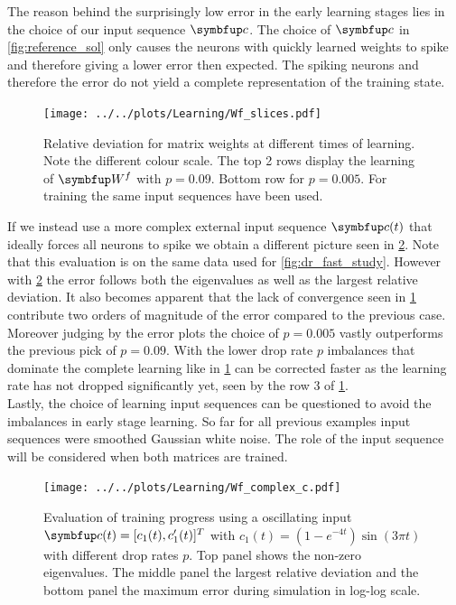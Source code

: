 The reason behind the surprisingly low error in the early learning stages lies in the choice of our input sequence $\bmu{c}$. The choice of $\bmu{c}$ in \cref{fig:reference_sol} only causes the neurons with quickly learned weights to spike and therefore giving a lower error then expected. The spiking neurons and therefore the error do not yield a complete representation of the training state.\\
\begin{figure}
	\centering
	\texttt{[image: ../../plots/Learning/Wf\_slices.pdf]}
	\caption{Relative deviation for matrix weights at different times of learning. Note the different colour scale. The top 2 rows display the learning of $\bmu{W}^f$ with $p = 0.09$. Bottom row for $p=0.005$. For training the same input sequences have been used.}
	\label{fig:Wf_slices}
\end{figure}
If we instead use a more complex external input sequence $\bmu{c}(t)$ that ideally forces all neurons to spike we obtain a different picture seen in \cref{fig:complex_seq}. Note that this evaluation is on the same data used for \cref{fig:dr_fast_study}. However with \cref{fig:complex_seq} the error follows both the eigenvalues as well as the largest relative deviation. It also becomes apparent that the lack of convergence seen in \cref{fig:Wf_slices} contribute two orders of magnitude of the error compared to the previous case. Moreover judging by the error plots the choice of $p = 0.005$ vastly outperforms the previous pick of $p= 0.09$. With the lower drop rate $p$ imbalances that dominate the complete learning like in \cref{fig:Wf_slices} can be corrected faster as the learning rate has not dropped significantly yet, seen by the row 3 of \cref{fig:Wf_slices}.\\
Lastly, the choice of learning input sequences can be questioned to avoid the imbalances in early stage learning. So far for all previous examples input sequences were smoothed Gaussian white noise. The role of the input sequence will be considered when both matrices are trained.\\
\begin{figure}
	\centering
	\texttt{[image: ../../plots/Learning/Wf\_complex\_c.pdf]}
	\caption{Evaluation of training progress using a oscillating input $\bmu{c}(t) = [c_1(t),c_1'(t)]^T$ with $c_1(t) = (1-e^{-4t})\sin(3\pi t)$ with different drop rates $p$. Top panel shows the non-zero eigenvalues. The middle panel the largest relative deviation and the bottom panel the maximum error during simulation in log-log scale.}
	\label{fig:complex_seq}
\end{figure}

